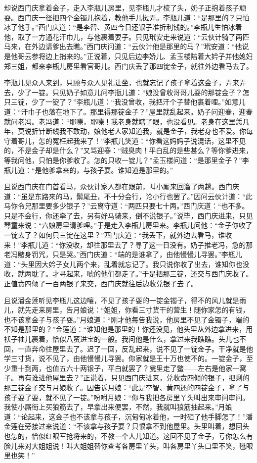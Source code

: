 却说西门庆拿着金子，走入李瓶儿房里，见李瓶儿才梳了头，奶子正抱着孩子顽耍。西门庆一径把四个金镯儿抱着，教他手儿挝弄。李瓶儿道：“是那里的？只怕冰了他手。”西门庆道：“是李智、黄四今日还银子准折利钱的。”李瓶儿生怕冰着他，取了一方通花汗巾儿，与他裹着耍子。只见玳安走来说道：“云伙计骑了两匹马来，在外边请爹出去瞧。”西门庆问道：“云伙计他是那里的马？”玳安道：“他说是他哥云参将边上捎来的。”正说着，只见后边李娇儿、孟玉楼陪着大妗子并他媳妇郑三姐，都来李瓶儿房里看官哥儿。西门庆丢了那四锭金子，就往外边看马去了。

李瓶儿见众人来到，只顾与众人见礼让坐，也就忘记了孩子拿着这金子，弄来弄去，少了一锭。只见奶子如意儿问李瓶儿道：“娘没曾收哥哥儿耍的那锭金子？怎只三锭，少了一锭了？”李瓶儿道：“我没曾收，我把汗个子替他裹着哩。”如意儿道：“汗巾子也落在地下了。那里得那锭金子？”屋里就乱起来。奶子问迎春，迎春就问老冯。老冯道：“耶嚛，耶嚛！我老身就瞎了眼，也没看见。老身在这里恁几年，莫说折针断线我不敢动，娘他老人家知道我，就是金子，我老身也不爱。你每守着哥儿，怎的冤枉起我来了！”李瓶儿笑道：“你看这妈妈子说混话，这里不见的，不是金子却是什么？”又骂迎春：“贼臭肉！平白乱的是些甚么？等你爹进来，等我问他，只怕是你爹收了。怎的只收一锭儿？”孟玉楼问道：“是那里金子？”李瓶儿道：“是他爹拿来的，与孩子耍。谁知道是那里的。”

且说西门庆在门首看马，众伙计家人都在跟前，叫小厮来回溜了两趟。西门庆道：“虽是东路来的马，鬃尾丑，不十分会行，论小行也罢了。”因问云伙计道：“此马你令兄那里要多少银子？”云离守道：“两匹只要七十两。”西门庆道：“也不多。只是不会行，你还牵了去，另有好马骑来，倒不说银子。”说毕，西门庆进来，只见琴童来说：“六娘房里请爹哩。”于是走入李瓶儿房里来。李瓶儿问他：“金子你收了一锭去了？如何只三锭在这里？”西门庆道：“我丢下，就外边去看马，谁收来！”李瓶儿道：“你没收，却往那里去了？寻了这一日没有。奶子推老冯，急的那老冯赌身罚咒，只是哭。”西门庆道：“端的是谁拿了，由他慢慢儿寻罢。”李瓶儿道：“头里因大妗子女儿两个来，乱着就忘记了。我只说你收了出去，谁知你也没收，就两耽了。才寻起来，唬的他们都走了。”于是把那三锭，还交与西门庆收了。正值贲四倾了一百两银子来交，西门庆就往后边收兑银子去了。

且说潘金莲听见李瓶儿这边嚷，不见了孩子耍的一锭金镯子，得不的风儿就是雨儿，就先走来房里，告月娘说：“姐姐，你看三寸货干的营生！随你家怎的有钱，也不该拿金子与孩子耍。”月娘道：“刚才他每告我说，他房里不见了金镯子，端的不知是那里的？”金莲道：“谁知他是那里的！你还没见，他头里从外边拿进来，用袄子袖儿裹着，恰似八蛮进宝的一般。我问他是什么，拿过来我瞧瞧。头儿也不回，一直奔命往屋里去了。迟了一回，反乱起来，说不见了一锭金子。干净就是他学三寸货，说不见了，由他慢慢儿寻罢。你家就是王十万也使不的。一锭金子，至少重十到两，也值五六十两银子，平白就罢了？瓮里走了鳖——左右是他家一窝子。再有谁进他屋里去？”正说着，只见西门庆进来，兑收贲四倾的银子，把剩的那三锭金子交与月娘收了。因告诉月娘：“此是李智、黄四还的四锭金子，拿了与孩子耍了耍，就不见了一锭。”吩咐月娘：“你与我把各房里丫头叫出来审问审问。我使小厮街上买狼筋去了，早拿出来便罢，不然，我就叫狼筋抽起来。”月娘道：“论起来，这金子也不该拿与孩子，沉甸甸冰着他，一时砸了他手脚怎了！”潘金莲在旁接过来说道：“不该拿与孩子耍？只恨拿不到他屋里。头里叫着，想回头也怎的，恰似红眼军抢将来的，不教一个人儿知道。这回不见了金子，亏你怎么有脸儿来对大姐姐说！叫大姐姐替你查考各房里丫头，叫各房里丫头口里不笑，毴眼里也笑！”

